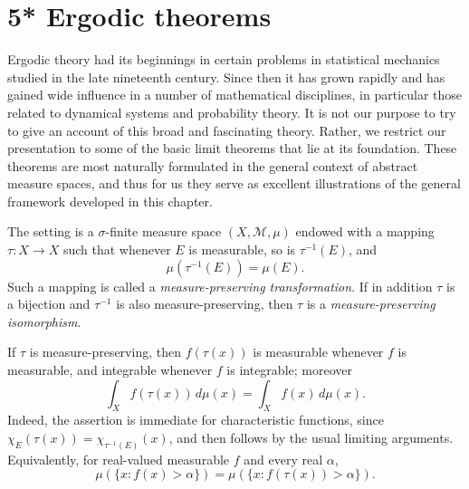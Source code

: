 \documentclass[11pt,openany]{book}
\begin{document}
\setcounter{section}{5}
\setcounter{theorem}{0}
\section*{5* Ergodic theorems}

Ergodic theory had its beginnings in certain problems in statistical mechanics studied in the late nineteenth century. Since then it has grown rapidly and has gained wide influence in a number of mathematical disciplines, in particular those related to dynamical systems and probability theory. It is not our purpose to try to give an account of this broad and fascinating theory. Rather, we restrict our presentation to some of the basic limit theorems that lie at its foundation. These theorems are most naturally formulated in the general context of abstract measure spaces, and thus for us they serve as excellent illustrations of the general framework developed in this chapter.

The setting is a $\sigma$-finite measure space $(X,\mathcal M,\mu)$ endowed with a mapping $\tau:X\to X$ such that whenever $E$ is measurable, so is $\tau^{-1}(E)$, and
\[
\mu(\tau^{-1}(E))=\mu(E).
\]
Such a mapping is called a \emph{measure-preserving transformation}. If in addition $\tau$ is a bijection and $\tau^{-1}$ is also measure-preserving, then $\tau$ is a \emph{measure-preserving isomorphism}.

If $\tau$ is measure-preserving, then $f(\tau(x))$ is measurable whenever $f$ is measurable, and integrable whenever $f$ is integrable; moreover
\begin{equation}
\int_X f(\tau(x))\,d\mu(x)=\int_X f(x)\,d\mu(x).
\tag{18}
\end{equation}
Indeed, the assertion is immediate for characteristic functions, since $\chi_E(\tau(x))=\chi_{\tau^{-1}(E)}(x)$, and then follows by the usual limiting arguments. Equivalently, for real-valued measurable $f$ and every real $\alpha$,
\[
\mu(\{x:f(x)>\alpha\})=\mu(\{x:f(\tau(x))>\alpha\}).
\]
\end{document}
